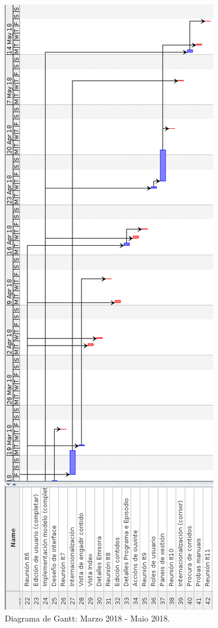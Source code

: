 \begin{figure}[H]
	\centering
	\includegraphics[scale=0.4,keepaspectratio=true]{./images/gantt/gantt3.png}
	\caption{Diagrama de Gantt: Marzo 2018 - Maio 2018. }
	\label{fig:gantt3}
\end{figure}

